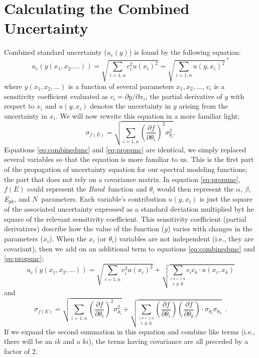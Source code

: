 \documentclass[11pt, oneside]{article}   	%
\newcommand{\band}{\textit{Band}}
\newcommand{\bandpars}{$\alpha$, $\beta$, \textit{E$_{pk}$}, and $N$}
\begin{document}
\section{Calculating the Combined Uncertainty}
Combined standard uncertainty ($u_c(y)$) is found by the following equation:
\begin{equation}\label{eq:combinedunc}
u_c(y(x_1,x_2,...)) = \sqrt{\sum_{i=1,n}c_i^2 u (x_i)^2} = \sqrt{\sum_{i=1,n} u (y, x_i)^2}^{\ *}
\end{equation}
where $y(x_1,x_2,...)$ is a function of several parameters $x_1,x_2,...$, $c_i$ is a sensitivity coefficient evaluated as $c_i = \partial y/\partial x_i$, the partial derivative of $y$ with respect to $x_i$ and $u(y,x_i)$ denotes the uncertainty in $y$ arising from the uncertainty in $x_i$. 
We will now rewrite this equation in a more familiar light;
\begin{equation}\label{eq:propunc}
\sigma_{f(E)} = \sqrt{\sum_{i=1,n} \left(\frac{\partial f}{\partial \theta_i}\right)^2 \sigma_{\theta_i}^2} .
\end{equation}
Equations \ref{eq:combinedunc} and \ref{eq:propunc} are identical, we simply replaced several variables so that the equation is more familiar to us. This is the first part of the propagation of uncertainty equation for our spectral modeling functions; the part that does not rely on a covariance matrix. In equation \ref{eq:propunc}, $f(E)$ could represent the \band \ function and $\theta_i$ would then represent the \bandpars \ parameters. 
Each variable's contribution $u(y, x_i)$ is just the square of the associated uncertainty expressed as a standard deviation multiplied byt he square of the relevant sensitivity coefficient. This sensitivity coefficient (partial derivatives) describe how the value of the function ($y$) varies with changes in the parameters ($x_i$). When the $x_i$ (or $\theta_i$) variables are not independent (i.e., they are covariant), then we add on an additional term to equations \ref{eq:combinedunc} and \ref{eq:propunc};
\begin{equation}\label{eq:combinedunc2}
u_c(y(x_1,x_2,...)) = \sqrt{\sum_{i=1,n}c_i^2 u (x_i)^2} + \sqrt{\sum_{\stackrel{i,k=1,n}{i \neq k}} c_i c_k \cdot u (x_i, x_k)} 
\end{equation}
and 
\begin{equation}\label{eq:propunc2}
\sigma_{f(E)} = \sqrt{\sum_{i=1,n} \left(\frac{\partial f}{\partial \theta_i}\right)^2 \sigma_{\theta_i}^2}  + \sqrt{\sum_{\stackrel{i,k=1,n}{i \neq k}} \left(\frac{\partial f}{\partial \theta_i}\right) \left(\frac{\partial f}{\partial \theta_k}\right) \cdot \sigma_{\theta_i} \sigma_{\theta_k} } \ \ .
\end{equation}
If we expand the second summation in this equation and combine like terms (i.e., there will be an $ik$ and a $ki$), the terms having covariance are all preceded by a factor of 2. 
\end{document}
